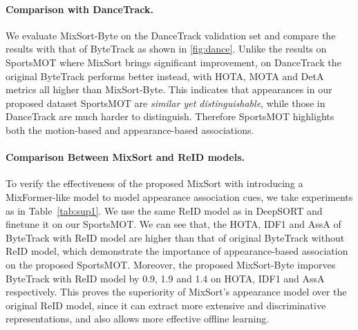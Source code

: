 \documentclass[10pt,twocolumn,letterpaper]{article}
\begin{document}
\paragraph{Comparison with DanceTrack.}
We evaluate MixSort-Byte on the DanceTrack validation set and compare the results with that of ByteTrack as shown in \cref{fig:dance}. Unlike the results on SportsMOT where MixSort brings significant improvement, on DanceTrack the original ByteTrack performs better instead, with HOTA, MOTA and DetA metrics all higher than MixSort-Byte. This indicates that appearances in our proposed dataset SportsMOT are \textit{similar yet distinguishable}, while those in DanceTrack are much harder to distinguish. Therefore SportsMOT highlights both the motion-based and appearance-based associations.
\begin{table}[pt]
\vspace{-1mm}
\vspace{-2.8mm}
\caption{Comparison of ByteTrack and MixSort-Byte on DanceTrack validation set. For MixSort-Byte, the fuse parameter $\alpha$ is 0.9, which results in the highest HOTA among \{0.6, 0.7, 0.8, 0.9, 0.95\}. The models are trained on DanceTrack training set.}
\vspace{-4mm}
\label{fig:dance}
\end{table}


\paragraph{Comparison Between MixSort and ReID models.}
To verify the effectiveness of the proposed MixSort with introducing a MixFormer-like model to model appearance association cues, we take experiments as in Table~\ref{tab:sup1}. 
We use the same ReID model as in DeepSORT and finetune it on our SportsMOT. 
We can see that, the HOTA, IDF1 and AssA of ByteTrack with ReID model are higher than that of original ByteTrack without ReID model, which demonstrate the importance of appearance-based association on the proposed SportsMOT.
Moreover, the proposed MixSort-Byte imporves ByteTrack with ReID model by 0.9, 1.9 and 1.4 on HOTA, IDF1 and AssA respectively.
This proves the superiority of MixSort's appearance model over the original ReID model, since it can extract more extensive and discriminative representations, and also allows more effective offline learning.
\end{document}
